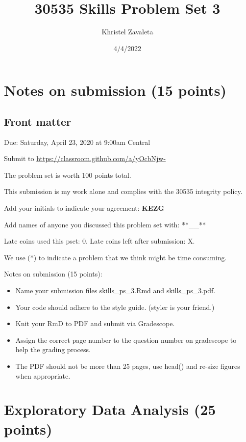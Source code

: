 \documentclass[
]{article}
\title{30535 Skills Problem Set 3}
\author{Khristel Zavaleta}
\date{4/4/2022}
\begin{document}
\maketitle

\hypertarget{notes-on-submission-15-points}{%
\section{Notes on submission (15
points)}\label{notes-on-submission-15-points}}

\hypertarget{front-matter}{%
\subsection{Front matter}\label{front-matter}}

Due: Saturday, April 23, 2020 at 9:00am Central

Submit to \url{https://classroom.github.com/a/yOcbNjw-}

The problem set is worth 100 points total.

This submission is my work alone and complies with the 30535 integrity
policy.

Add your initials to indicate your agreement: \textbf{KEZG}

Add names of anyone you discussed this problem set with: **\_\_**

Late coins used this pset: 0. Late coins left after submission: X.

We use (*) to indicate a problem that we think might be time consuming.

Notes on submission (15 points):

\begin{itemize}
\item
  Name your submission files skills\_ps\_3.Rmd and skills\_ps\_3.pdf.
\item
  Your code should adhere to the style guide. (styler is your friend.)
\item
  Knit your RmD to PDF and submit via Gradescope.
\item
  Assign the correct page number to the question number on gradescope to
  help the grading process.
\item
  The PDF should not be more than 25 pages, use head() and re-size
  figures when appropriate.
\end{itemize}

\pagebreak

\hypertarget{exploratory-data-analysis-25-points}{%
\section{Exploratory Data Analysis (25
points)}\label{exploratory-data-analysis-25-points}}
\end{document}
